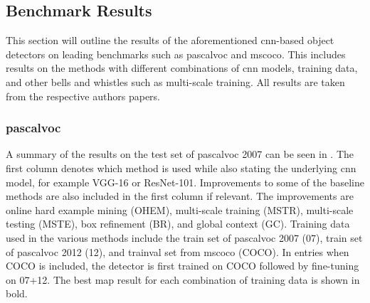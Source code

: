 \subsection{Benchmark Results}

This section will outline the results of the aforementioned \gls{cnn}-based object detectors on leading benchmarks such as \gls{pascalvoc} and \gls{mscoco}. This includes results on the methods with different combinations of \gls{cnn} models, training data, and other bells and whistles such as multi-scale training. All results are taken from the respective authors papers.

\subsubsection{\gls{pascalvoc}}
A summary of the results on the test set of \gls{pascalvoc} 2007 can be seen in . The first column denotes which method is used while also stating the underlying \gls{cnn} model, for example VGG-16 or ResNet-101. Improvements to some of the baseline methods are also included in the first column if relevant. The improvements are online hard example mining (OHEM), multi-scale training (MSTR), multi-scale testing (MSTE), box refinement (BR), and global context (GC). Training data used in the various methods include the train set of \gls{pascalvoc} 2007 (07), train set of \gls{pascalvoc} 2012 (12), and trainval set from \gls{mscoco} (COCO). In entries when COCO is included, the detector is first trained on COCO followed by fine-tuning on 07+12. The best \gls{map} result for each combination of training data is shown in bold.



